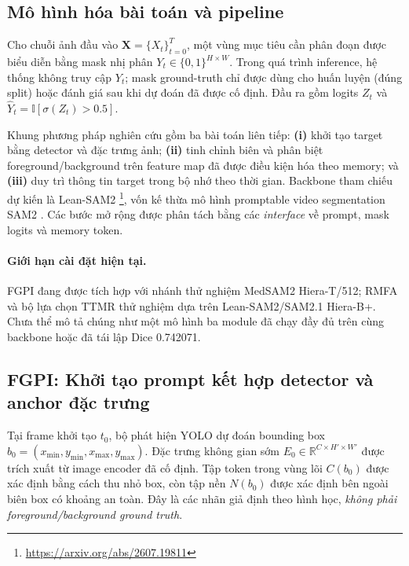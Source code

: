 \subsection{Mô hình hóa bài toán và pipeline}
\label{subsec:adeseg-pipeline}

Cho chuỗi ảnh đầu vào $\mathbf{X}=\{X_t\}_{t=0}^{T}$, một vùng mục tiêu
cần phân đoạn được biểu diễn bằng mask nhị phân $Y_t\in\{0,1\}^{H\times W}$.
Trong quá trình inference, hệ thống không truy cập $Y_t$; mask ground-truth
chỉ được dùng cho huấn luyện (đúng split) hoặc đánh giá sau khi dự đoán
đã được cố định. Đầu ra gồm logits $Z_t$ và
$\widehat{Y}_t=\mathbb{I}[\sigma(Z_t)>0.5]$.

Khung phương pháp nghiên cứu gồm ba bài toán liên tiếp:
\textbf{(i)} khởi tạo target bằng detector và đặc trưng ảnh;
\textbf{(ii)} tinh chỉnh biên và phân biệt foreground/background trên
feature map đã được điều kiện hóa theo memory; và
\textbf{(iii)} duy trì thông tin target trong bộ nhớ theo thời gian.
Backbone tham chiếu dự kiến là Lean-SAM2 \footnote{\url{https://arxiv.org/abs/2607.19811}},
vốn kế thừa mô hình promptable video segmentation SAM2
\cite{ravi2024sam2}. Các bước mở rộng được phân tách bằng các
\textit{interface} về prompt, mask logits và memory token.

\paragraph{Giới hạn cài đặt hiện tại.}
FGPI đang được tích hợp với nhánh thử nghiệm MedSAM2 Hiera-T/512; RMFA
và bộ lựa chọn TTMR thử nghiệm dựa trên Lean-SAM2/SAM2.1 Hiera-B+.
Chưa thể mô tả chúng như một mô hình ba module đã chạy đầy đủ trên
cùng backbone hoặc đã tái lập Dice 0.742071.

\subsection{FGPI: Khởi tạo prompt kết hợp detector và anchor đặc trưng}
\label{subsec:adeseg-fgpi}

Tại frame khởi tạo $t_0$, bộ phát hiện YOLO dự đoán bounding box
$b_0=(x_{\min},y_{\min},x_{\max},y_{\max})$. Đặc trưng không gian sớm
$E_0\in\mathbb{R}^{C\times H'\times W'}$ được trích xuất từ image
encoder đã cố định. Tập token trong vùng lõi $C(b_0)$ được xác định
bằng cách thu nhỏ box, còn tập nền $N(b_0)$ được xác định bên ngoài
biên box có khoảng an toàn. Đây là các nhãn giả định theo hình học,
\emph{không phải foreground/background ground truth}.

